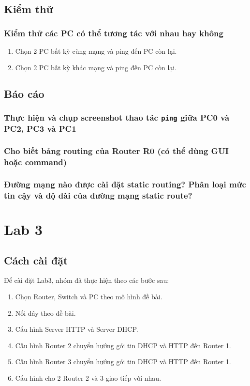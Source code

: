 \documentclass[]{article}
\begin{document}
\subsection{Kiểm thử}
\subsubsection{Kiểm thử các PC có thể tương tác với nhau hay không}
\begin{enumerate}
    \item Chọn 2 PC bất kỳ cùng mạng và ping đến PC còn lại.
    \item Chọn 2 PC bất kỳ khác mạng và ping đến PC còn lại.
\end{enumerate}

\subsection{Báo cáo}
\subsubsection{Thực hiện và chụp screenshot thao tác \texttt{ping} giữa PC0 và PC2, PC3 và PC1}\label{Lab02-task1}
\subsubsection{Cho biết bảng routing của Router R0 (có thể dùng GUI hoặc command)}
\subsubsection{Đường mạng nào được cài đặt static routing? Phân loại mức tin cậy và độ dài của đường mạng static route?}

\section{Lab 3}
\subsection{Cách cài đặt}
Để cài đặt Lab3, nhóm đã thực hiện theo các bước sau:
\begin{enumerate}
    \item Chọn Router, Switch và PC theo mô hình đề bài.
    \item Nối dây theo đề bài.
    \item Cấu hình Server HTTP và Server DHCP.
    \item Cấu hình Router 2 chuyển hướng gói tin DHCP và HTTP đến Router 1.
    \item Cấu hình Router 3 chuyển hướng gói tin DHCP và HTTP đến Router 1.
    \item Cấu hình cho 2 Router 2 và 3 giao tiếp với nhau.
\end{enumerate}
\end{document}
